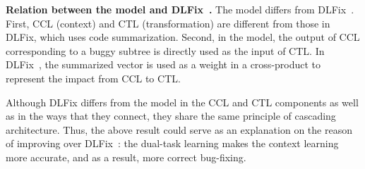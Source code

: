 {\bf Relation between the  model and
  DLFix~\cite{icse20}.} The  model differs from
DLFix~\cite{icse20}. First, CCL (context) and CTL (transformation) are
different from those in DLFix, which uses code summarization. Second,
in the  model, the output of CCL corresponding to a
buggy subtree is directly used as the input of CTL. In
DLFix~\cite{icse20}, the summarized vector is used as a weight in a
cross-product to represent the impact from CCL to CTL.

Although DLFix differs from the  model in the CCL and
CTL components as well as in the ways that they connect, they share
the same principle of cascading architecture. Thus, the above result
could serve as an explanation on the reason of {\tool} improving over
DLFix~\cite{icse20}: the dual-task learning makes the context learning
more accurate, and as a result, more correct bug-fixing.






